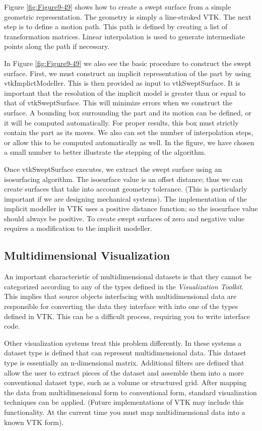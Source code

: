 Figure \ref{fig:Figure9-49} shows how to create a swept surface from a simple geometric representation. The geometry is simply a line-stroked VTK. The next step is to define a motion path. This path is defined by creating a list of transformation matrices. Linear interpolation is used to generate intermediate points along the path if necessary.

In Figure \ref{fig:Figure9-49} we also see the basic procedure to construct the swept surface. First, we must construct an implicit representation of the part by using vtkImplictModeller. This is then provided as input to vtkSweptSurface. It is important that the resolution of the implicit model is greater than or equal to that of vtkSweptSurface. This will minimize errors when we construct the surface. A bounding box surrounding the part and its motion can be defined, or it will be computed automatically. For proper results, this box must strictly contain the part as its moves. We also can set the number of interpolation steps, or allow this to be computed automatically as well. In the figure, we have chosen a small number to better illustrate the stepping of the algorithm.

Once vtkSweptSurface executes, we extract the swept surface using an isosurfacing algorithm. The isosurface value is an offset distance; thus we can create surfaces that take into account geometry tolerance. (This is particularly important if we are designing mechanical systems). The implementation of the implicit modeller in VTK uses a positive distance function; so the isosurface value should always be positive. To create swept surfaces of zero and negative value requires a modification to the implicit modeller.


\subsection{Multidimensional Visualization}

An important characteristic of multidimensional datasets is that they cannot be categorized according to any of the types defined in the \emph{Visualization Toolkit}. This implies that source objects interfacing with multidimensional data are responsible for converting the data they interface with into one of the types defined in VTK. This can be a difficult process, requiring you to write interface code.

Other visualization systems treat this problem differently. In these systems a dataset type is defined that can represent multidimensional data. This dataset type is essentially an n-dimensional matrix. Additional filters are defined that allow the user to extract pieces of the dataset and assemble them into a more conventional dataset type, such as a volume or structured grid. After mapping the data from multidimensional form to conventional form, standard visualization techniques can be applied. (Future implementations of VTK may include this functionality. At the current time you must map multidimensional data into a known VTK form).


